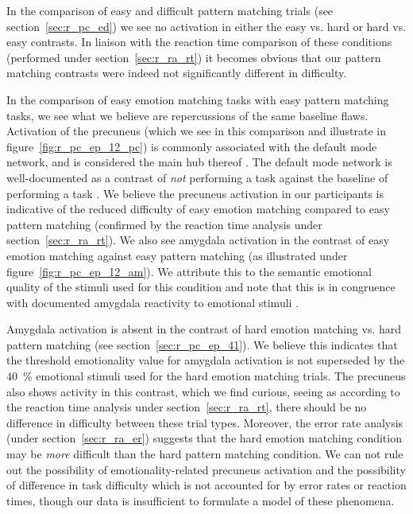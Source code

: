 	    In the comparison of easy and difficult pattern matching trials (see section~\ref{sec:r_pc_ed}) we see no activation in either the easy vs. hard or hard vs. easy contrasts.
	    In liaison with the reaction time comparison of these conditions (performed under section~\ref{sec:r_ra_rt}) it becomes obvious that our pattern matching contrasts were indeed not significantly different in difficulty.
	    
	    In the comparison of easy emotion matching tasks with easy pattern matching tasks, we see what we believe are repercussions of the same baseline flaws.
	    Activation of the precuneus (which we see in this comparison and illustrate in figure~\ref{fig:r_pc_ep_12_pc}) is commonly associated with the default mode network, and is considered the main hub thereof \citep{Cavanna2007}.
	    The default mode network is well-documented as a contrast of \textit{not} performing a task against the baseline of performing a task \citep{Raichle2007}.
	    We believe the precuneus activation in our participants is indicative of the reduced difficulty of easy emotion matching compared to easy pattern matching (confirmed by the reaction time analysis under section~\ref{sec:r_ra_rt}).
	    We also see amygdala activation in the contrast of easy emotion matching against easy pattern matching (as illustrated under figure~\ref{fig:r_pc_ep_12_am}).
	    We attribute this to the semantic emotional quality of the stimuli used for this condition and note that this is in congruence with documented amygdala reactivity to emotional stimuli \citep{Hariri2002}.
	    
	    Amygdala activation is absent in the contrast of hard emotion matching vs. hard pattern matching (see section~\ref{sec:r_pc_ep_41}).
	    We believe this indicates that the threshold emotionality value for amygdala activation is not superseded by the \SI{40}{\percent} emotional stimuli used for the hard emotion matching trials.
	    The precuneus also shows activity in this contrast, which we find curious, seeing as according to the reaction time analysis under section~\ref{sec:r_ra_rt}, there should be no difference in difficulty between these trial types.
	    Moreover, the error rate analysis (under section~\ref{sec:r_ra_er}) suggests that the hard emotion matching condition may be \textit{more} difficult than the hard pattern matching condition.
	    We can not rule out the possibility of emotionality-related precuneus activation and the possibility of difference in task difficulty which is not accounted for by error rates or reaction times, though our data is insufficient to formulate a model of these phenomena.
	    
